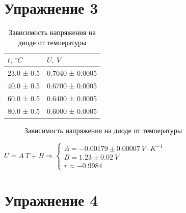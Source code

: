 \documentclass[12pt]{article}
\begin{document}
\section*{Упражнение 3}
  
  \begin{table}[H]
  \begin{tabular}{ll}
  	\toprule
  	$t,\: ^{\circ}C$ &             $U,\: V$ \\
  	\midrule
  	23.0 ± 0.5 &  0.7040 ± 0.0005 \\
  	40.0 ± 0.5 &  0.6700 ± 0.0005 \\
  	60.0 ± 0.5 &  0.6400 ± 0.0005 \\
  	80.0 ± 0.5 &  0.6000 ± 0.0005 \\
  	\bottomrule
  \end{tabular}
\caption{Зависимость напряжения на диоде от температуры}
\end{table}

\begin{figure}[H]
	\caption{Зависимость напряжения на диоде от температуры}
	\label{fig:image5}
\end{figure}

$U = A \: T + B \Longrightarrow \left\lbrace \begin{array}{c}
A = -0.00179 \pm 0.00007 \: V \cdot K^{-1}\\ 
B = 1.23 \pm 0.02 \: V\\ 
r \approx -0.9984
\end{array}\right. $


\section*{Упражнение 4}
\end{document}
